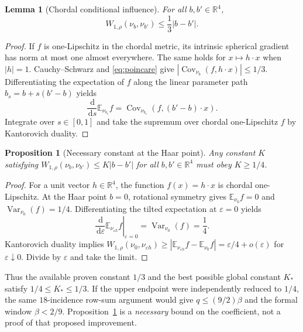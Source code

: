 \documentclass[11pt,a4paper]{article}
\numberwithin{equation}{section}
\newtheorem{proposition}[theorem]{Proposition}
\newtheorem{lemma}[theorem]{Lemma}
\newcommand{\E}{\mathbb E}
\newcommand{\Cov}{\operatorname{Cov}}
\newcommand{\Var}{\operatorname{Var}}
\newcommand{\dd}{\,\mathrm d}
\begin{document}
\begin{lemma}[Chordal conditional influence]
\label{lem:W1}
For all \(b,b'\in\mathbb R^4\),
\begin{equation}
 W_{1,\rho}(\nu_b,\nu_{b'})
          \leq\frac13|b-b'|.
                                                        \label{eq:w1}
\end{equation}
\end{lemma}
\begin{proof}
If \(f\) is one-Lipschitz in the chordal metric, its
intrinsic spherical gradient has norm at most one almost
everywhere. The same holds for \(x\mapsto h\cdot x\)
when \(|h|=1\). Cauchy--Schwarz and
\eqref{eq:poincare} give
\(|\Cov_{\nu_b}(f,h\cdot x)|\leq1/3\).
Differentiating the expectation of \(f\) along the linear
parameter path \(b_s=b+s(b'-b)\) yields
\[
 \frac{\dd}{\dd s}\E_{\nu_{b_s}}f
      =\Cov_{\nu_{b_s}}(f,(b'-b)\cdot x).
\]
Integrate over \(s\in[0,1]\) and take the supremum
over chordal one-Lipschitz \(f\) by Kantorovich duality.
\end{proof}

\begin{proposition}[Necessary constant at the Haar point]
\label{prop:quarter}
Any constant \(K\) satisfying
\(W_{1,\rho}(\nu_b,\nu_{b'})\leq K|b-b'|\)
for all \(b,b'\in\mathbb R^4\) must obey \(K\geq1/4\).
\end{proposition}
\begin{proof}
For a unit vector \(h\in\mathbb R^4\), the function
\(f(x)=h\cdot x\) is chordal one-Lipschitz.
At the Haar point \(b=0\), rotational symmetry
gives \(\E_{\nu_0}f=0\) and
\(\Var_{\nu_0}(f)=1/4\). Differentiating the
tilted expectation at \(\varepsilon=0\) yields
\[
 \left.\frac{\dd}{\dd\varepsilon}
     \E_{\nu_{\varepsilon h}}f
       \right|_{\varepsilon=0}
      =\Var_{\nu_0}(f)=\frac14.
\]
Kantorovich duality implies
\(W_{1,\rho}(\nu_0,\nu_{\varepsilon h})
 \geq |\E_{\nu_{\varepsilon h}}f-\E_{\nu_0}f|
 =\varepsilon/4+o(\varepsilon)\) for
\(\varepsilon\downarrow0\). Divide by
\(\varepsilon\) and take the limit.
\end{proof}

Thus the available proven constant \(1/3\) and the best
possible global constant \(K_\ast\) satisfy
\(1/4\leq K_\ast\leq1/3\).
If the upper endpoint were independently reduced to
\(1/4\), the same \(18\)-incidence row-sum argument
would give \(q\leq(9/2)\beta\) and the formal window
\(\beta<2/9\). Proposition~\ref{prop:quarter}
is a \emph{necessary} bound on the coefficient,
not a proof of that proposed improvement.
\end{document}
